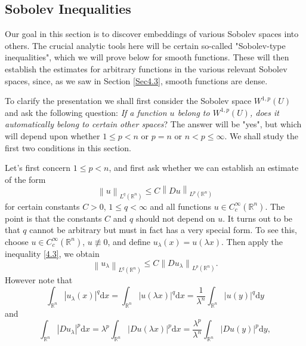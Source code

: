 \subsection{Sobolev Inequalities}\label{Sec4.6}
Our goal in this section is to discover embeddings of various Sobolev spaces into others. The crucial analytic tools here will be certain so-called "Sobolev-type inequalities", which we will prove below for smooth functions. These will then establish the estimates for arbitrary functions in the various relevant Sobolev spaces, since, as we saw in Section \ref{Sec4.3}, smooth functions are dense.\par
To clarify the presentation we shall first consider the Sobolev space $W^{1,p}(U)$ and ask the following question: \textit{If a function $u$ belong to $W^{1,p}(U)$, does it automatically belong to certain other spaces}? The answer will be "yes", but which will depend upon whether $1\le p<n$ or $p=n$ or $n<p\le\infty$. We shall study the first two conditions in this section.\par
Let's first concern $1\le p<n$, and first ask whether we can establish an estimate of the form 
\begin{equation}\label{4.3}
\left\| u \right\| _{L^q\left( \mathbb{R} ^n \right)}\le C\left\| Du \right\| _{L^p\left( \mathbb{R} ^n \right)}
\end{equation}
for certain constants $C>0$, $1\le q<\infty$ and all functions $u\in C_c^\infty(\mathbb{R}^n)$. The point is that the constants $C$ and $q$ should not depend on $u$. It turns out to be that $q$ cannot be arbitrary but must in fact has a very special form. To see this, choose $u\in C_c^\infty(\mathbb{R}^n)$, $u\not\equiv 0$, and define $u_\lambda(x)=u(\lambda x)$. Then apply the inequality \eqref{4.3}, we obtain 
\begin{equation}\label{4.4}
\left\| u_{\lambda} \right\| _{L^q\left( \mathbb{R} ^n \right)}\le C\left\| Du_{\lambda} \right\| _{L^p\left( \mathbb{R} ^n \right)}.
\end{equation}
However note that 
$$
\int_{\mathbb{R} ^n}{\left| u_{\lambda}\left( x \right) \right|^q\mathrm{d}x}=\int_{\mathbb{R} ^n}{\left| u\left( \lambda x \right) \right|^q\mathrm{d}x}=\frac{1}{\lambda ^n}\int_{\mathbb{R} ^n}{\left| u\left( y \right) \right|^q\mathrm{d}y}
$$
and 
$$
\int_{\mathbb{R} ^n}{\left| Du_{\lambda} \right|^p\mathrm{d}x}=\lambda ^p\int_{\mathbb{R} ^n}{\left| Du\left( \lambda x \right) \right|^p\mathrm{d}x}=\frac{\lambda ^p}{\lambda ^n}\int_{\mathbb{R} ^n}{\left| Du\left( y \right) \right|^p\mathrm{d}y},
$$
